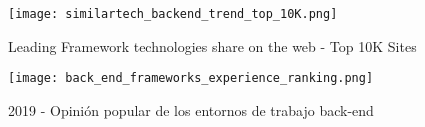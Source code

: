 \begin{figure}
	\centering
	\texttt{[image: similartech\_backend\_trend\_top\_10K.png]}
	\caption{Leading Framework technologies share on the web - Top 10K Sites}
	\label{fig:similartech:backend}
\end{figure}

\begin{figure}
	\centering
	\texttt{[image: back\_end\_frameworks\_experience\_ranking.png]}
	\caption{2019 - Opinión popular de los entornos de trabajo back-end}
	\label{fig:stjs2019:backend}
\end{figure}